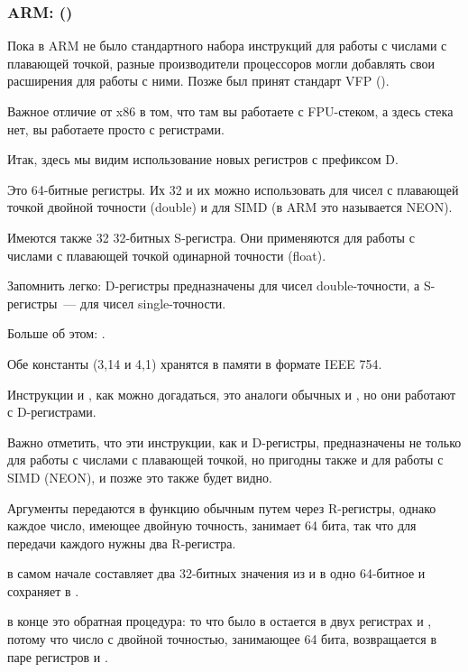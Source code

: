 \subsubsection{ARM: \OptimizingXcodeIV (\ARMMode)}

Пока в ARM не было стандартного набора инструкций для работы с числами с плавающей точкой, разные производители процессоров
могли добавлять свои расширения для работы с ними.
Позже был принят стандарт VFP ().

Важное отличие от x86 в том, что там вы работаете с FPU-стеком, а здесь стека нет, вы работаете просто с регистрами.



Итак, здесь мы видим использование новых регистров с префиксом D.

Это 64-битные регистры. Их 32 и их можно
использовать для чисел с плавающей точкой двойной точности (double) и для 
SIMD (в ARM это называется NEON).

Имеются также 32 32-битных S-регистра. Они применяются для работы с числами 
с плавающей точкой одинарной точности (float).

Запомнить легко: D-регистры предназначены для чисел double-точности, 
а S-регистры~--- для чисел single-точности.

Больше об этом: .

Обе константы (3,14 и 4,1) хранятся в памяти в формате IEEE 754.

Инструкции  и , как можно догадаться, это аналоги обычных  и \MOV, но они работают с D-регистрами.

Важно отметить, что эти инструкции, как и D-регистры, предназначены не только для работы 
с числами с плавающей точкой, но пригодны также и для работы с SIMD (NEON), и позже это также будет видно.

Аргументы передаются в функцию обычным путем через R-регистры, однако 
каждое число, имеющее двойную точность, занимает 64 бита, так что для передачи каждого нужны два R-регистра.

 в самом начале составляет два 32-битных значения из  и  в одно 64-битное и сохраняет в .

 в конце это обратная процедура: то что было в  
остается в двух регистрах  и , потому что число с двойной точностью, 
занимающее 64 бита, возвращается в паре регистров  и .

